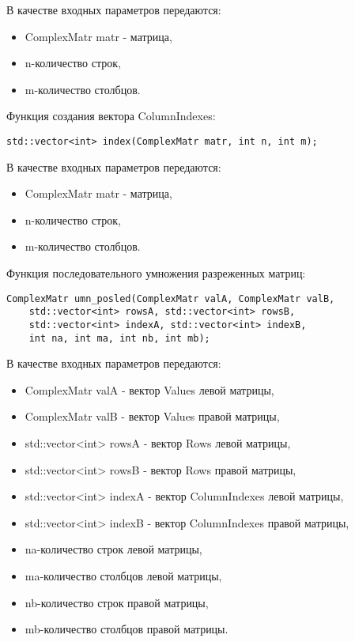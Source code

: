 \documentclass{report}
\begin{document}
\par В качестве входных параметров передаются:
\begin{itemize}
\item ComplexMatr matr - матрица,
\item n-количество строк,
\item m-количество столбцов.
\end{itemize}
\par Функция создания вектора ColumnIndexes:
\begin{lstlisting}
std::vector<int> index(ComplexMatr matr, int n, int m);
\end{lstlisting}
\par В качестве входных параметров передаются:
\begin{itemize}
\item ComplexMatr matr - матрица,
\item n-количество строк,
\item m-количество столбцов.
\end{itemize}
\par Функция последовательного умножения разреженных матриц:
\begin{lstlisting}
ComplexMatr umn_posled(ComplexMatr valA, ComplexMatr valB,
    std::vector<int> rowsA, std::vector<int> rowsB,
    std::vector<int> indexA, std::vector<int> indexB,
    int na, int ma, int nb, int mb);
\end{lstlisting}
\par В качестве входных параметров передаются:
\begin{itemize}
\item ComplexMatr valA - вектор Values левой матрицы,
\item ComplexMatr valB - вектор Values правой матрицы,
\item std::vector<int> rowsA - вектор Rows левой матрицы,
\item std::vector<int> rowsB - вектор Rows правой матрицы,
\item std::vector<int> indexA - вектор ColumnIndexes левой матрицы,
\item std::vector<int> indexB - вектор ColumnIndexes правой матрицы,
\item na-количество строк левой матрицы,
\item ma-количество столбцов левой матрицы,
\item nb-количество строк правой матрицы,
\item mb-количество столбцов правой матрицы.
\end{itemize}
\end{document}
